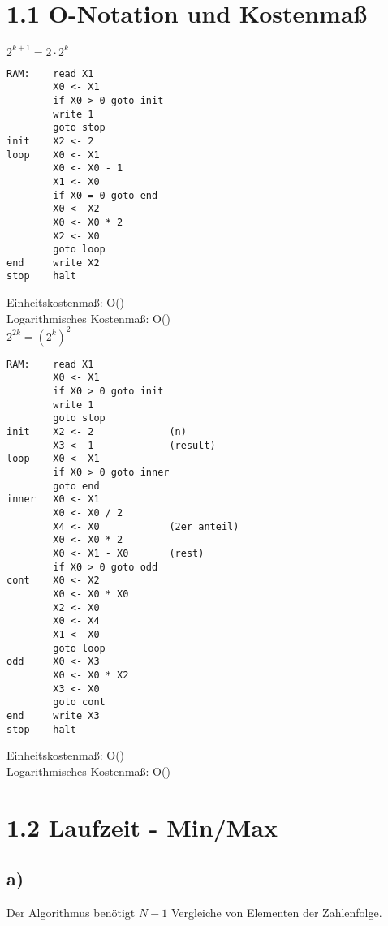 

\section*{1.1 O-Notation und Kostenmaß}

\textbf{$2^{k+1} = 2 \cdot 2^k$}

\begin{lstlisting}
RAM:    read X1
        X0 <- X1
        if X0 > 0 goto init
        write 1
        goto stop
init    X2 <- 2
loop    X0 <- X1
        X0 <- X0 - 1
        X1 <- X0
        if X0 = 0 goto end
        X0 <- X2
        X0 <- X0 * 2
        X2 <- X0
        goto loop
end     write X2
stop    halt    
\end{lstlisting}
\noindent
Einheitskostenmaß: O() \\
Logarithmisches Kostenmaß: O()\\

\noindent
\textbf{$2^{2k} = (2^k)^2$}
\begin{lstlisting}
RAM:    read X1
        X0 <- X1
        if X0 > 0 goto init
        write 1
        goto stop
init    X2 <- 2             (n)
        X3 <- 1             (result)
loop    X0 <- X1
        if X0 > 0 goto inner
        goto end
inner   X0 <- X1
        X0 <- X0 / 2        
        X4 <- X0            (2er anteil)
        X0 <- X0 * 2
        X0 <- X1 - X0       (rest)
        if X0 > 0 goto odd
cont    X0 <- X2
        X0 <- X0 * X0
        X2 <- X0
        X0 <- X4
        X1 <- X0
        goto loop
odd     X0 <- X3
        X0 <- X0 * X2
        X3 <- X0
        goto cont
end     write X3
stop    halt    
\end{lstlisting}

\noindent
Einheitskostenmaß: O() \\
Logarithmisches Kostenmaß: O()\\

\section*{1.2 Laufzeit - Min/Max}
\subsection*{a)}
Der Algorithmus benötigt $N - 1$ Vergleiche von Elementen der Zahlenfolge.
